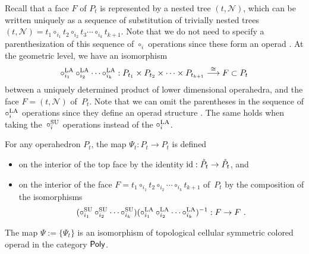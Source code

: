 Recall that a face $F$ of $P_t$ is represented by a nested tree $(t,\mathcal{N})$, which can be written uniquely as a sequence of substitution of trivially nested trees 
$(t,\mathcal{N})=t_1\circ_{i_1} t_2 \circ_{i_2} t_3 \cdots \circ_{i_k} t_{k+1}$.
Note that we do not need to specify a parenthesization of this sequence of $\circ_i$ operations since these form an operad \cite[Def. 4.7]{LA21}.
At the geometric level, we have an isomorphism
\[\circ_{i_1}^{\mathrm{LA}} \circ_{i_2}^{\mathrm{LA}} \cdots \circ_{i_k}^{\mathrm{LA}}: P_{t_1} \times P_{t_2} \times \cdots \times P_{t_{k+1}} \overset{\cong}{\longrightarrow} F \subset P_t \]
between a uniquely determined product of lower dimensional operahedra, and the face $F=(t,\mathcal{N})$ of~$P_t$.
Note that we can omit the parentheses in the sequence of $\circ_i^{\mathrm{LA}}$ operations since they define an operad structure \cite[Thm 4.18]{LA21}.
The same holds when taking the~$\circ_i^{\mathrm{SU}}$ operations instead of the $\circ_i^{\mathrm{LA}}$. 

\begin{definition}
    For any operahedron $P_t$, the map $\Psi_t : P_t \to P_t$ is defined 
    \begin{itemize}
        \item on the interior of the top face by the identity $\mathrm{id} : \mathring P_t \to \mathring P_t$, and 
        \item on the interior of the face $F=t_1 \circ_{i_1} t_2 \circ_{i_2} \cdots \circ_{i_k} t_{k+1}$ of~$P_t$ by the composition of the isomorphisms
        \[ 
        (\circ_{i_1}^{\mathrm{SU}} \circ_{i_2}^{\mathrm{SU}} \cdots \circ_{i_k}^{\mathrm{SU}}) (\circ_{i_1}^{\mathrm{LA}} \circ_{i_2}^{\mathrm{LA}} \cdots \circ_{i_k}^{\mathrm{LA}})^{-1}: F \to F \ . \] 
    \end{itemize}
\end{definition}

\begin{proposition}
    \label{thm:top-iso}
    The map $\Psi:=\{\Psi_t\}$ is an isomorphism of topological cellular symmetric colored operad in the category $\mathsf{Poly}$.
\end{proposition}

